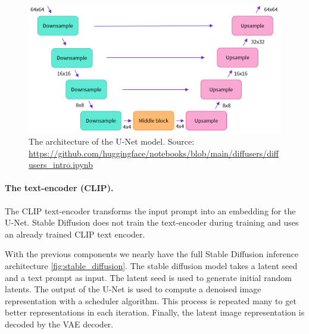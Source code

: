 \begin{figure}[ht]
    \centering
    \includegraphics[width=\linewidth]{images/diffusion/unet-model.png}
    \caption{The architecture of the U-Net model. Source: \url{https://github.com/huggingface/notebooks/blob/main/diffusers/diffusers_intro.ipynb}}
    \label{fig:unet_model}
\end{figure}

\paragraph{The text-encoder (CLIP).} The CLIP \cite{radford2021clip} text-encoder transforms the input prompt into an embedding for the U-Net. Stable Diffusion does not train the text-encoder during training and uses an already trained CLIP text encoder.

With the previous components we nearly have the full Stable Diffusion inference architecture \cref{fig:stable_diffusion}. The stable diffusion model takes a latent seed and a text prompt as input. The latent seed is  used to generate initial random latents. The output of the U-Net is used to compute a denoised image representation with a scheduler algorithm. This process is repeated many to get better representations in each iteration. Finally, the latent image representation is decoded by the VAE decoder.

